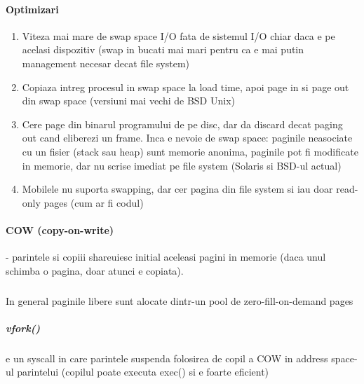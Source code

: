 \documentclass{article}
\begin{document}
\paragraph*{Optimizari}
\begin{enumerate}
    \item Viteza mai mare de swap space I/O fata de sistemul I/O chiar daca e pe acelasi dispozitiv (swap in bucati mai mari pentru ca e mai putin management necesar decat file system)
    \item Copiaza intreg procesul in swap space la load time, apoi page in si page out din swap space (versiuni mai vechi de BSD Unix)
    \item Cere page din binarul programului de pe disc, dar da discard decat paging out cand eliberezi un frame. Inca e nevoie de swap space: paginile neasociate cu un fisier (stack sau heap) sunt memorie anonima, paginile pot fi modificate in memorie, dar nu scrise imediat pe file system (Solaris si BSD-ul actual)
    \item Mobilele nu suporta swapping, dar cer pagina din file system si iau doar read-only pages (cum ar fi codul)
\end{enumerate}

\paragraph*{COW (copy-on-write)} - parintele si copiii shareuiesc initial aceleasi pagini in memorie (daca unul schimba o pagina, doar atunci e copiata).
\subparagraph*{}In general paginile libere sunt alocate dintr-un pool de zero-fill-on-demand pages
\subparagraph*{vfork()} e un syscall in care parintele suspenda folosirea de copil a COW in address space-ul parintelui (copilul poate executa exec() si e foarte eficient)
\end{document}
